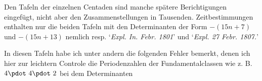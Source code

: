 Den Tafeln der einzelnen Centaden sind manche spätere Berichtigungen eingefügt, nicht aber den Zusammenstellungen in Tausenden. Zeitbestimmungen enthalten nur die beiden Tafeln mit den Determinanten der Form $-(15n+7)$ und $-(15n+13)$ nemlich resp. ‘\textit{Expl. In. Febr. 1801}’ und ‘\textit{Expl. 27 Febr. 1807.}’
\par In diesen Tafeln habe ich unter andern die folgenden Fehler bemerkt, denen ich hier zur leichtern Controle die Periodenzahlen der Fundamentalclassen wie z. B. $4\pdot\ 4\pdot\ 2$ bei dem Determinanten
